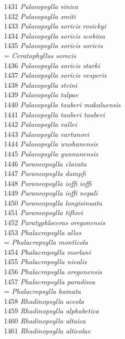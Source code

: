 \documentclass[
]{article}
\begin{document}
1431 \emph{Palaeopsylla sinica}\\
1432 \emph{Palaeopsylla smiti}\\
1433 \emph{Palaeopsylla soricis rosickyi}\\
1434 \emph{Palaeopsylla soricis scobina}\\
1435 \emph{Palaeopsylla soricis soricis}\\
= \emph{Ceratophyllus sorecis}\\
1436 \emph{Palaeopsylla soricis starki}\\
1437 \emph{Palaeopsylla soricis vesperis}\\
1438 \emph{Palaeopsylla steini}\\
1439 \emph{Palaeopsylla talpae}\\
1440 \emph{Palaeopsylla tauberi makaluensis}\\
1441 \emph{Palaeopsylla tauberi tauberi}\\
1442 \emph{Palaeopsylla vallei}\\
1443 \emph{Palaeopsylla vartanovi}\\
1444 \emph{Palaeopsylla wushanensis}\\
1445 \emph{Palaeopsylla yunnanensis}\\
1446 \emph{Paraneopsylla clavata}\\
1447 \emph{Paraneopsylla dampfi}\\
1448 \emph{Paraneopsylla ioffi ioffi}\\
1449 \emph{Paraneopsylla ioffi nepali}\\
1450 \emph{Paraneopsylla longisinuata}\\
1451 \emph{Paraneopsylla tiflovi}\\
1452 \emph{Paratyphloceras oregonensis}\\
1453 \emph{Phalacropsylla allos}\\
= \emph{Phalacropsylla monticola}\\
1454 \emph{Phalacropsylla morlani}\\
1455 \emph{Phalacropsylla nivalis}\\
1456 \emph{Phalacropsylla oregonensis}\\
1457 \emph{Phalacropsylla paradisea}\\
= \emph{Phalacropsylla hamata}\\
1458 \emph{Rhadinopsylla accola}\\
1459 \emph{Rhadinopsylla alphabetica}\\
1460 \emph{Rhadinopsylla altaica}\\
1461 \emph{Rhadinopsylla alticolae}\\
\end{document}
